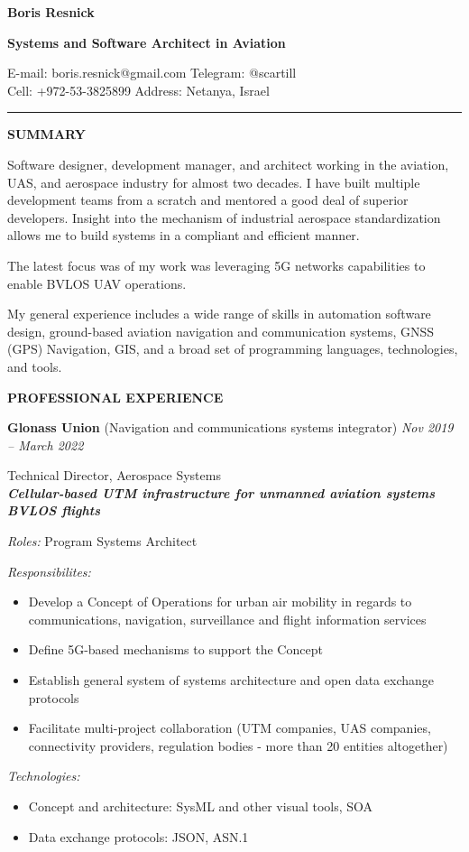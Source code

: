 \documentclass[a4paper]{article}
\newcommand{\project}[4]{

	\textbf{\textit{#1}}
    \vspace{2mm}

    \textit{Roles:} #2
    \vspace{2mm}

    \textit{Responsibilites:}
	\begin{itemize}
	    \setlength{\itemindent}{.5cm}
	    #3
    \end{itemize}
    
	\textit{Technologies:}
	\begin{itemize}
		\setlength{\itemindent}{.5cm}
		#4
	\end{itemize}
}
\begin{document}
    \thispagestyle{empty}
    
	\begin{center}
		{\Large \textbf{Boris Resnick}\par}
		\vspace{2mm}
		{\large \textbf{Systems and Software Architect in A\hspace{-.4mm}viation}\par}
		\vspace{1.5mm}
		E-mail: boris.resnick@gmail.com \vspace{1.5mm} \quad \quad
		Telegram: @scartill \\
		Cell: +972-53-3825899 \quad \quad
		Address: Netanya, Israel
	\end{center}
	\vspace{-2mm}
	\rule{\textwidth}{1pt}
	\vspace{2mm}

	\textbf{SUMMARY}
	\vspace{5mm}

	Software designer, development manager, and architect working in the aviation, UAS, and aerospace industry for almost two decades. I have built multiple development teams from a scratch and mentored a good deal of superior developers. Insight into the mechanism of industrial aerospace standardization allows me to build systems in a compliant and efficient manner.

	The latest focus was of my work was leveraging 5G networks capabilities to enable BVLOS UAV operations.

	My general experience includes a wide range of skills in automation software design, ground-based aviation navigation and communication systems, GNSS (GPS) Navigation, GIS, and a broad set of programming languages, technologies, and tools.

    \vspace{5mm}
	\textbf{PROFESSIONAL EXPERIENCE}
	\vspace{5mm}

	\textbf{Glonass Union} (Navigation and communications systems integrator) \hfill \textit{Nov 2019 -- March 2022}

    \vspace{2mm}
	Technical Director, Aerospace Systems \\
	
	\project{Cellular-based UTM infrastructure for unmanned aviation systems BVLOS flights}{
		Program Systems Architect
	}{
		\item Develop a Concept of Operations for urban air mobility in regards to communications, navigation, surveillance and flight information services 
		\item Define 5G-based mechanisms to support the Concept
		\item Establish general system of systems architecture and open data exchange protocols
		\item Facilitate multi-project collaboration (UTM companies, UAS companies, connectivity providers, regulation bodies - more than 20 entities altogether)
	}{
		\item Concept and architecture: SysML and other visual tools, SOA
		\item Data exchange protocols: JSON, ASN.1
	}
    
\end{document}
